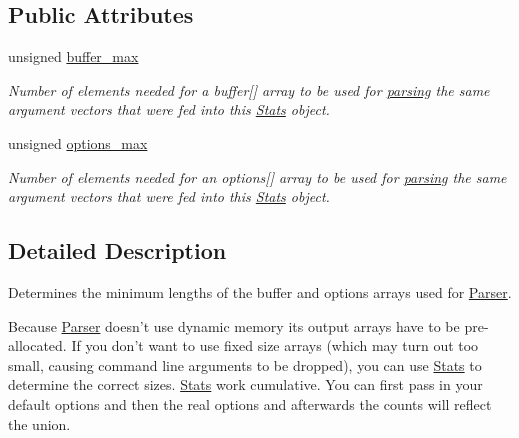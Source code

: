 \subsection*{Public Attributes}
\begin{DoxyCompactItemize}
\item 
unsigned \hyperlink{structxmem_1_1config_1_1third__party_1_1_stats_a42c3ec9a6baf2c24d783b00279266298}{buffer\-\_\-max}
\begin{DoxyCompactList}\small\item\em Number of elements needed for a {\ttfamily buffer}\mbox{[}\mbox{]} array to be used for \hyperlink{classxmem_1_1config_1_1third__party_1_1_parser_a0e45d97675bc5d003ef6f68ac8cd7249}{parsing} the same argument vectors that were fed into this \hyperlink{structxmem_1_1config_1_1third__party_1_1_stats}{Stats} object. \end{DoxyCompactList}\item 
unsigned \hyperlink{structxmem_1_1config_1_1third__party_1_1_stats_a74f645c06ae7eab5058f2a51226c2dcd}{options\-\_\-max}
\begin{DoxyCompactList}\small\item\em Number of elements needed for an {\ttfamily options}\mbox{[}\mbox{]} array to be used for \hyperlink{classxmem_1_1config_1_1third__party_1_1_parser_a0e45d97675bc5d003ef6f68ac8cd7249}{parsing} the same argument vectors that were fed into this \hyperlink{structxmem_1_1config_1_1third__party_1_1_stats}{Stats} object. \end{DoxyCompactList}\end{DoxyCompactItemize}


\subsection{Detailed Description}
Determines the minimum lengths of the buffer and options arrays used for \hyperlink{classxmem_1_1config_1_1third__party_1_1_parser}{Parser}. 

Because \hyperlink{classxmem_1_1config_1_1third__party_1_1_parser}{Parser} doesn't use dynamic memory its output arrays have to be pre-\/allocated. If you don't want to use fixed size arrays (which may turn out too small, causing command line arguments to be dropped), you can use \hyperlink{structxmem_1_1config_1_1third__party_1_1_stats}{Stats} to determine the correct sizes. \hyperlink{structxmem_1_1config_1_1third__party_1_1_stats}{Stats} work cumulative. You can first pass in your default options and then the real options and afterwards the counts will reflect the union. 

